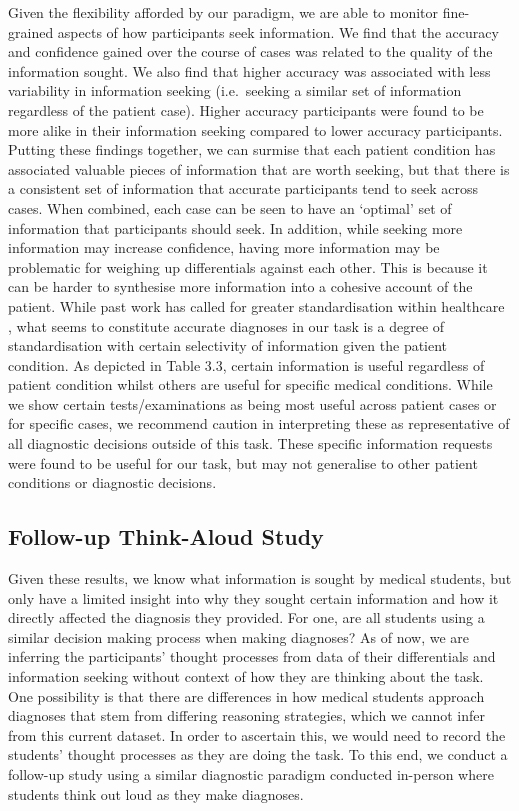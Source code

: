 \documentclass[a4paper, nobind]{templates/ociamthesis}
\begin{document}
Given the flexibility afforded by our paradigm, we are able to monitor fine-grained aspects of how participants seek information. We find that the accuracy and confidence gained over the course of cases was related to the quality of the information sought. We also find that higher accuracy was associated with less variability in information seeking (i.e.~seeking a similar set of information regardless of the patient case). Higher accuracy participants were found to be more alike in their information seeking compared to lower accuracy participants. Putting these findings together, we can surmise that each patient condition has associated valuable pieces of information that are worth seeking, but that there is a consistent set of information that accurate participants tend to seek across cases. When combined, each case can be seen to have an `optimal' set of information that participants should seek. In addition, while seeking more information may increase confidence, having more information may be problematic for weighing up differentials against each other. This is because it can be harder to synthesise more information into a cohesive account of the patient. While past work has called for greater standardisation within healthcare \autocite{wears_standardisation_2015}, what seems to constitute accurate diagnoses in our task is a degree of standardisation with certain selectivity of information given the patient condition. As depicted in Table 3.3, certain information is useful regardless of patient condition whilst others are useful for specific medical conditions. While we show certain tests/examinations as being most useful across patient cases or for specific cases, we recommend caution in interpreting these as representative of all diagnostic decisions outside of this task. These specific information requests were found to be useful for our task, but may not generalise to other patient conditions or diagnostic decisions.

\subsection*{Follow-up Think-Aloud Study}\label{follow-up-think-aloud-study}

Given these results, we know what information is sought by medical students, but only have a limited insight into why they sought certain information and how it directly affected the diagnosis they provided. For one, are all students using a similar decision making process when making diagnoses? As of now, we are inferring the participants' thought processes from data of their differentials and information seeking without context of how they are thinking about the task. One possibility is that there are differences in how medical students approach diagnoses that stem from differing reasoning strategies, which we cannot infer from this current dataset. In order to ascertain this, we would need to record the students' thought processes as they are doing the task. To this end, we conduct a follow-up study using a similar diagnostic paradigm conducted in-person where students think out loud as they make diagnoses.
\end{document}
